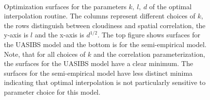 \begin{figure}[p]
\centering
\captionsetup[subfigure]{labelformat=empty}
\vspace{-1em} \\
\caption[Optimization surfaces for OI parameters]{Optimization
  surfaces for the parameters $k,\: l,\: d$ of the optimal
  interpolation routine. The columns represent different choices of
  $k$, the rows distinguish between cloudiness and spatial
  correlation, the y-axis is $l$ and the x-axis is $d^{1/2}$. The top
  figure shows surfaces for the UASIBS model and the bottom is for the
  semi-empirical model. Note, that for all choices of $k$ and the
  correlation parameterization, the surfaces for the UASIBS model have
  a clear minimum. The surfaces for the semi-empirical model have less
  distinct minima indicating that optimal interpolation is not
  particularly sensitive to parameter choice for this model.}
\label{fig:paramopt}
\end{figure}

